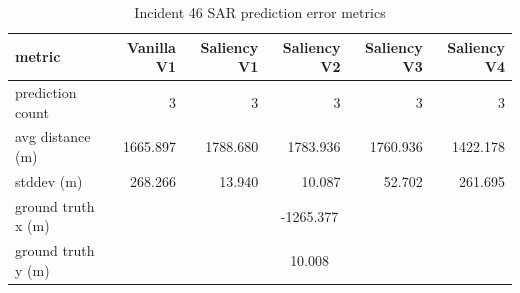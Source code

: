 \begin{table}[ht]
\centering
\caption{Incident 46 SAR prediction error metrics}
\label{tab:sar-incident-46}
\begin{tabular}{lrrrrr}
\hline
metric & Vanilla V1 & Saliency V1 & Saliency V2 & Saliency V3 & Saliency V4 \\
\hline
prediction count & 3 & 3 & 3 & 3 & 3 \\
avg distance (m) & 1665.897 & 1788.680 & 1783.936 & 1760.936 & 1422.178 \\
stddev (m) & 268.266 & 13.940 & 10.087 & 52.702 & 261.695 \\
ground truth x (m) & \multicolumn{5}{c}{-1265.377} \\
ground truth y (m) & \multicolumn{5}{c}{10.008} \\
\hline
\end{tabular}
\end{table}
